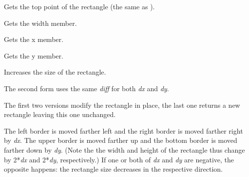 \label{wxrectgettop}


Gets the top point of the rectangle (the same as ).


\label{wxrectgetwidth}


Gets the width member.


\label{wxrectgetx}


Gets the x member.


\label{wxrectgety}


Gets the y member.


\label{wxrectinflate}





Increases the size of the rectangle.

The second form uses the same {\it diff} for both {\it dx} and {\it dy}.

The first two versions modify the rectangle in place, the last one returns a
new rectangle leaving this one unchanged.

The left border is moved farther left and the right border is moved farther
right by {\it dx}. The upper border is moved farther up and the bottom border
is moved farther down by {\it dy}. (Note the the width and height of the
rectangle thus change by 2*{\it dx} and 2*{\it dy}, respectively.) If one or
both of {\it dx} and {\it dy} are negative, the opposite happens: the rectangle
size decreases in the respective direction.

